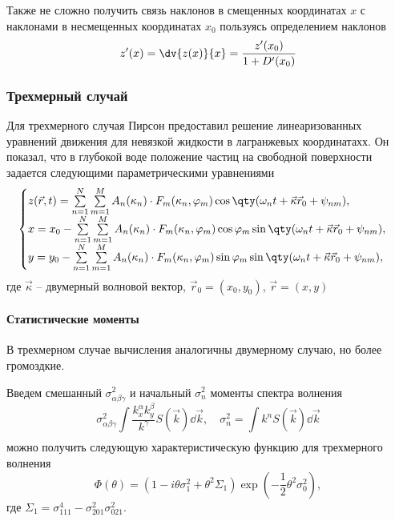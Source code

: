 Также не сложно получить связь наклонов в смещенных координатах $x$ с наклонами
в несмещенных координатах $x_0$ пользуясь определением наклонов
 \begin{equation}
    \label{eq:}
    z'(x) = \dv{z(x)}{x} = \frac{z'(x_0)}{1 + D'(x_0)}
\end{equation}



\subsubsection{Трехмерный случай}%

Для трехмерного случая Пирсон \cite{cite:pierson} предоставил решение
линеаризованных уравнений движения для невязкой жидкости в лагранжевых
координатахх. Он показал, что в глубокой воде положение частиц на свободной поверхности задается следующими параметрическими уравнениями
\begin{equation}
    \begin{cases}
        \label{eq:surface2dcwm}
        z(\vec r,t) = \sum\limits_{n=1}^{N} \sum\limits_{m=1}^{M}
        A_n(\kappa_n) \cdot
        F_m(\kappa_n,\phi_m) \cos \qty(\omega_n t + \vec \kappa \vec r_0 +
        \psi_{nm}),    \\
        x = x_0 - \sum\limits_{n=1}^{N} \sum\limits_{m=1}^{M}
        A_n(\kappa_n) \cdot
        F_m(\kappa_n,\phi_m) \cos\phi_m \sin\qty(\omega_n t + \vec \kappa \vec r_0 +
        \psi_{nm}),\\
        y = y_{0} - \sum\limits_{n=1}^{N} \sum\limits_{m=1}^{M}
        A_n(\kappa_n) \cdot
        F_m(\kappa_n,\phi_m) \sin \phi_m \sin \qty(\omega_n t + \vec \kappa \vec
        r_0 + \psi_{nm}),
    \end{cases}
\end{equation}
где $\vec \kappa$ -- двумерный волновой вектор,  
$\vec r_0 = (x_0, y_0)$, $\vec r = (x, y)$


\paragraph{Статистические моменты}
\label{par:statisticheskie_momenty}
В трехмерном случае вычисления аналогичны двумерному случаю, но более
громоздкие.  

Введем смешанный $\sigma_{\alpha \beta \gamma}^2$ и начальный $\sigma_n^2$ моменты спектра волнения
\begin{equation}
    \sigma^2_{\alpha \beta \gamma} \int\limits_{} \frac{k_x^\alpha
    k_y^\beta}{k^{\gamma}} S(\vec k) \dd \vec k,\quad
    \sigma_n^2 = \int\limits_{}^{} k^n S(\vec k) \dd \vec k 
\end{equation}
можно получить следующую характеристическую функцию для трехмерного волнения
\begin{equation}
    \Phi(\theta) = (1 - i \theta \sigma_1^2 + \theta^2 \Sigma_1)
    \exp(-\frac{1}{2} \theta^2 \sigma_0^2),
\end{equation}
где $\Sigma_1 = \sigma^4_{111} - \sigma_{201}^2 \sigma_{021}^2$.

